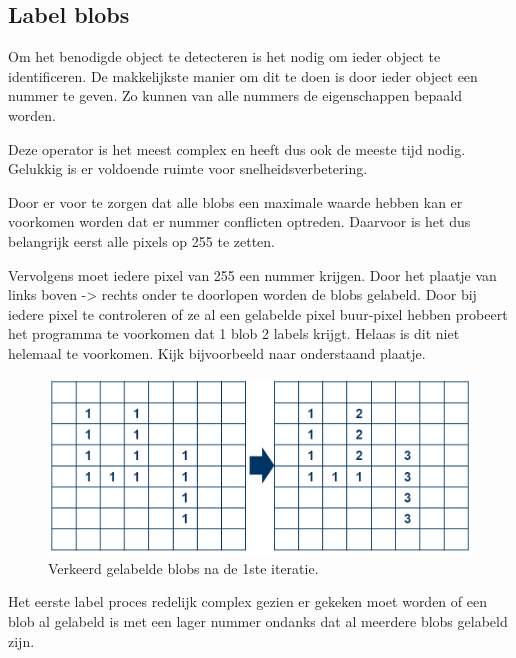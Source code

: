 \subsection{Label blobs}
\label{sec:labelblobs}

Om het benodigde object te detecteren is het nodig om ieder object te
identificeren. De makkelijkste manier om dit te doen is door ieder object een
nummer te geven. Zo kunnen van alle nummers de eigenschappen bepaald worden.

Deze operator is het meest complex en heeft dus ook de meeste tijd nodig.
Gelukkig is er voldoende ruimte voor snelheidsverbetering.

Door er voor te zorgen dat alle blobs een maximale waarde hebben kan er voorkomen
worden dat er nummer conflicten optreden. Daarvoor is het dus belangrijk eerst
alle pixels op 255 te zetten.

Vervolgens moet iedere pixel van 255 een nummer krijgen. Door het plaatje van
links boven -> rechts onder te doorlopen worden de blobs gelabeld. Door bij
iedere pixel te controleren of ze al een gelabelde pixel buur-pixel hebben
probeert het programma te voorkomen dat 1 blob 2 labels krijgt. Helaas is dit
niet helemaal te voorkomen. Kijk bijvoorbeeld naar onderstaand plaatje.

\begin{figure}
    \begin{center}
        \includegraphics[scale=0.4]{figures/label_blobs_step1.png}
    \end{center}
    \caption{Verkeerd gelabelde blobs na de 1ste iteratie.}
    \label{fig:lbstep1}
\end{figure}

Het eerste label proces redelijk complex gezien er gekeken moet worden of een
blob al gelabeld is met een lager nummer ondanks dat al meerdere blobs gelabeld
zijn.

